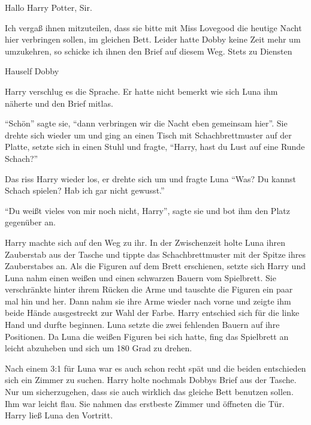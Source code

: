 \begin{brief}
Hallo Harry Potter, Sir.

Ich vergaß ihnen mitzuteilen, dass sie bitte mit Miss Lovegood die heutige Nacht hier verbringen sollen, im gleichen Bett. Leider hatte Dobby keine Zeit mehr um umzukehren, so schicke ich ihnen den Brief auf diesem Weg.
\signumspace
Stets zu Diensten

Hauself Dobby
\end{brief}

Harry verschlug es die Sprache.  Er hatte nicht bemerkt wie sich Luna ihm näherte und den Brief mitlas.

\enquote{Schön} sagte sie, \enquote{dann verbringen wir die Nacht eben gemeinsam hier}. Sie drehte sich wieder um und ging an einen Tisch mit Schachbrettmuster auf der Platte, setzte sich in einen Stuhl und fragte, \enquote{Harry, hast du Lust auf eine Runde Schach?}

Das riss Harry wieder los, er drehte sich um und fragte Luna \enquote{Was? Du kannst Schach spielen? Hab ich gar nicht gewusst.}

\enquote{Du weißt vieles von mir noch nicht, Harry}, sagte sie und bot ihm den Platz gegenüber an.

Harry machte sich auf den Weg zu ihr. In der Zwischenzeit holte Luna ihren Zauberstab aus der Tasche und tippte das Schachbrettmuster mit der Spitze ihres Zauberstabes an. Als die Figuren auf dem Brett erschienen, setzte sich Harry und Luna nahm einen weißen und einen schwarzen Bauern vom Spielbrett. Sie verschränkte hinter ihrem Rücken die Arme und tauschte die Figuren ein paar mal hin und her. Dann nahm sie ihre Arme wieder nach vorne und zeigte ihm beide Hände ausgestreckt zur Wahl der Farbe. Harry entschied sich für die linke Hand und durfte beginnen. Luna setzte die zwei fehlenden Bauern auf ihre Positionen. Da Luna die weißen Figuren bei sich hatte, fing das Spielbrett an leicht abzuheben und sich um 180 Grad zu drehen.

Nach einem 3:1 für Luna war es auch schon recht spät und die beiden entschieden sich ein Zimmer zu suchen. Harry holte nochmals Dobbys Brief aus der Tasche. Nur um sicherzugehen, dass sie auch wirklich das gleiche Bett benutzen sollen. Ihm war leicht flau. Sie nahmen das erstbeste Zimmer und öffneten die Tür. Harry ließ Luna den Vortritt.

